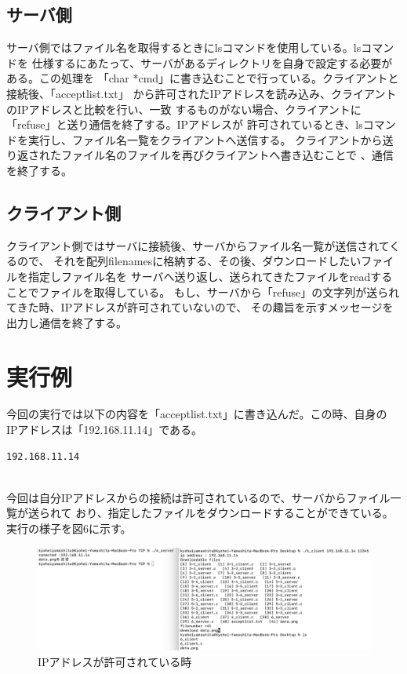 \documentclass[dvipdfmx,autodetect-engine,titlepage]{jsarticle}
\begin{document}
\subsection{サーバ側}
サーバ側ではファイル名を取得するときにlsコマンドを使用している。lsコマンドを
仕様するにあたって、サーバがあるディレクトリを自身で設定する必要がある。この処理を
「char *cmd」に書き込むことで行っている。クライアントと接続後、「acceptlist.txt」
から許可されたIPアドレスを読み込み、クライアントのIPアドレスと比較を行い、一致
するものがない場合、クライアントに「refuse」と送り通信を終了する。IPアドレスが
許可されているとき、lsコマンドを実行し、ファイル名一覧をクライアントへ送信する。
クライアントから送り返されたファイル名のファイルを再びクライアントへ書き込むことで
、通信を終了する。

\subsection{クライアント側}
クライアント側ではサーバに接続後、サーバからファイル名一覧が送信されてくるので、
それを配列filenamesに格納する、その後、ダウンロードしたいファイルを指定しファイル名を
サーバへ送り返し、送られてきたファイルをreadすることでファイルを取得している。
もし、サーバから「refuse」の文字列が送られてきた時、IPアドレスが許可されていないので、
その趣旨を示すメッセージを出力し通信を終了する。

\section{実行例}
今回の実行では以下の内容を「acceptlist.txt」に書き込んだ。この時、自身の
IPアドレスは「192.168.11.14」である。

\begin{lstlisting}[caption = acceptlist.txt]
    192.168.11.14
    
\end{lstlisting}

今回は自分IPアドレスからの接続は許可されているので、サーバからファイル一覧が送られて
おり、指定したファイルをダウンロードすることができている。実行の様子を図6に示す。\\

\begin{figure}[h]
    \centering
    \includegraphics[scale=0.45]{pic7.png}
    \caption{IPアドレスが許可されている時}
\end{figure}
\end{document}
